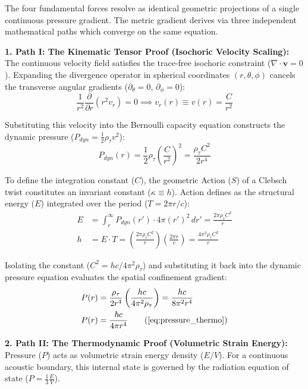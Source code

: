 The four fundamental forces resolve as identical geometric projections of a single continuous pressure gradient. The metric gradient derives via three independent mathematical paths which converge on the same equation.

\vspace{0.2 cm}

\textbf{1. Path I: The Kinematic Tensor Proof (Isochoric Velocity Scaling):} \\
The continuous velocity field satisfies the trace-free isochoric constraint ($\nabla \cdot \mathbf{v} = 0$). Expanding the divergence operator in spherical coordinates $(r, \theta, \phi)$ cancels the transverse angular gradients ($\partial_\theta = 0$, $\partial_\phi = 0$): 
\begin{equation}
    \frac{1}{r^2} \frac{\partial}{\partial r}(r^2 v_r) = 0 \implies v_r(r) \equiv v(r) = \frac{C}{r^2} 
\end{equation}

Substituting this velocity into the Bernoulli capacity equation constructs the dynamic pressure ($P_{dyn} = \frac{1}{2}\rho_\tau v^2$):
\begin{equation}
    P_{dyn}(r) = \frac{1}{2}\rho_\tau \left( \frac{C}{r^2} \right)^2 = \frac{\rho_\tau C^2}{2 r^4}
\end{equation}

To define the integration constant ($C$), the geometric Action ($S$) of a Clebsch twist constitutes an invariant constant ($\kappa \equiv h$). Action defines as the structural energy ($E$) integrated over the period ($T = 2\pi r/c$):
\begin{align}
    E &= \int_r^\infty P_{dyn}(r') \cdot 4\pi (r')^2 \, dr' = \frac{2\pi \rho_\tau C^2}{r} \nonumber \\
    h &= E \cdot T = \left( \frac{2\pi \rho_\tau C^2}{r} \right) \left( \frac{2\pi r}{c} \right) = \frac{4\pi^2 \rho_\tau C^2}{c}
\end{align}

Isolating the constant ($C^2 = h c / 4\pi^2 \rho_\tau$) and substituting it back into the dynamic pressure equation evaluates the spatial confinement gradient:
\begin{align}
    P(r) &= \frac{\rho_\tau}{2 r^4} \left( \frac{h c}{4\pi^2 \rho_\tau} \right) = \frac{h c}{8\pi^2 r^4}  \\
    P(r) &= \frac{\hbar c}{4\pi r^4} \tag{\ref{eq:pressure_thermo}}
\end{align}

\textbf{2. Path II: The Thermodynamic Proof (Volumetric Strain Energy):} \\
Pressure ($P$) acts as volumetric strain energy density ($E/V$). For a continuous acoustic boundary, this internal state is governed by the radiation equation of state ($P = \frac{1}{3} \frac{E}{V}$). 

